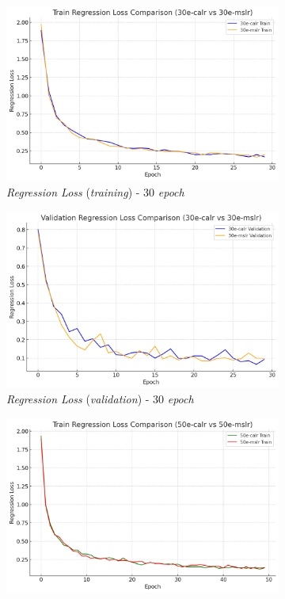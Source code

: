 \begin{figure}[htbp]
  \centering
  \begin{subfigure}{0.45\textwidth}
    \includegraphics[width=\textwidth]{gambar/bab4-train-regloss-30e.png}
    \caption{\emph{Regression Loss} (\emph{training}) - 30 \emph{epoch}}
  \end{subfigure}
  \hfill
  \begin{subfigure}{0.45\textwidth}
    \includegraphics[width=\textwidth]{gambar/bab4-val-regloss-30e.png}
    \caption{\emph{Regression Loss} (\emph{validation}) - 30 \emph{epoch}}
  \end{subfigure}
  \hfill
  \begin{subfigure}{0.45\textwidth}
    \includegraphics[width=\textwidth]{gambar/bab4-train-regloss-50e.png}

\end{subfigure}
\end{figure}
